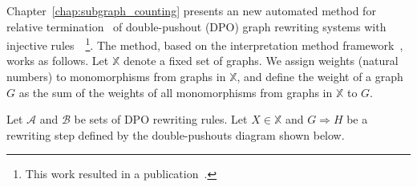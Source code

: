 

Chapter~\ref{chap:subgraph_counting} presents an new automated method for relative termination~\cite{geser1990relative} of double-pushout (DPO) graph rewriting systems with injective rules~\cite{corradini1997algebraic,habel2001double,konig2018atutorial}~\footnote{This work resulted in a publication~\cite{qiu2025termination_icgt}.}. The method, based on the interpretation method framework~\cite{nipkow1998term,contejean2005mechanically}, works as follows. Let \( \mathbb{X} \) denote a fixed set of graphs. We assign weights (natural numbers) to monomorphisms from graphs in \( \mathbb{X} \), and define the weight of a graph $G$ as the sum of the weights of all monomorphisms from graphs in \( \mathbb{X} \) to $G$. 

Let $\mathcal{A}$ and $\mathcal{B}$ be sets of DPO rewriting rules. Let $X \in \mathbb{X}$ and $G \Rightarrow H$ be a rewriting step defined by the double-pushouts diagram shown below. 
\begin{center}
    \end{center}

